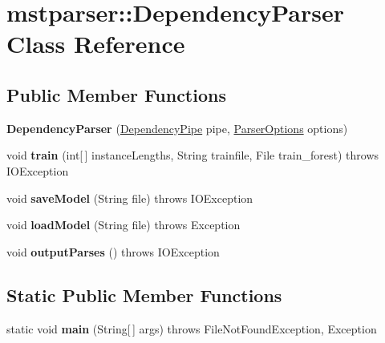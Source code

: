 \hypertarget{classmstparser_1_1DependencyParser}{
\section{mstparser::DependencyParser Class Reference}
\label{classmstparser_1_1DependencyParser}
}
\subsection*{Public Member Functions}
\begin{DoxyCompactItemize}
\item 
\hypertarget{classmstparser_1_1DependencyParser_a0bfeec5afb71a0633b642fafdfcfda03}{
{\bfseries DependencyParser} (\hyperlink{classmstparser_1_1DependencyPipe}{DependencyPipe} pipe, \hyperlink{classmstparser_1_1ParserOptions}{ParserOptions} options)}
\label{classmstparser_1_1DependencyParser_a0bfeec5afb71a0633b642fafdfcfda03}

\item 
\hypertarget{classmstparser_1_1DependencyParser_a8f238310312e312d248db13414dd9ccf}{
void {\bfseries train} (int\mbox{[}$\,$\mbox{]} instanceLengths, String trainfile, File train\_\-forest)  throws IOException }
\label{classmstparser_1_1DependencyParser_a8f238310312e312d248db13414dd9ccf}

\item 
\hypertarget{classmstparser_1_1DependencyParser_a9b60bc1edc2fd5176cd5a6823da8fb5e}{
void {\bfseries saveModel} (String file)  throws IOException }
\label{classmstparser_1_1DependencyParser_a9b60bc1edc2fd5176cd5a6823da8fb5e}

\item 
\hypertarget{classmstparser_1_1DependencyParser_ac96ac7e724c9cf2f3736fa8a5c5909f3}{
void {\bfseries loadModel} (String file)  throws Exception }
\label{classmstparser_1_1DependencyParser_ac96ac7e724c9cf2f3736fa8a5c5909f3}

\item 
\hypertarget{classmstparser_1_1DependencyParser_a9f199c0aa6535bec67d934d0bc6448b6}{
void {\bfseries outputParses} ()  throws IOException }
\label{classmstparser_1_1DependencyParser_a9f199c0aa6535bec67d934d0bc6448b6}

\end{DoxyCompactItemize}
\subsection*{Static Public Member Functions}
\begin{DoxyCompactItemize}
\item 
\hypertarget{classmstparser_1_1DependencyParser_a48f9d8e4dbada5fcf3c8d564782c854d}{
static void {\bfseries main} (String\mbox{[}$\,$\mbox{]} args)  throws FileNotFoundException, Exception     }
\label{classmstparser_1_1DependencyParser_a48f9d8e4dbada5fcf3c8d564782c854d}

\end{DoxyCompactItemize}
